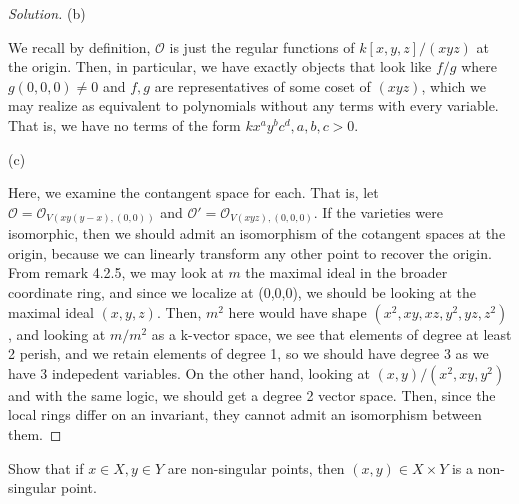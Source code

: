 \documentclass[10pt]{article}
\newenvironment{problem}[2][Problem]{\begin{trivlist}
\item[\hskip \labelsep {\bfseries #1}\hskip \labelsep {\bfseries #2.}]}{\end{trivlist}}
\begin{document}
\begin{proof}[Solution]
(b)

We recall by definition, $\mathcal{O}$ is just the regular functions of $k[x,y,z]/(xyz)$ at the origin. Then, in particular, we have exactly objects that look like $f/g$ where $g(0,0,0) \not = 0$ and $f,g$ are representatives of some coset of $(xyz)$, which we may realize as equivalent to polynomials without any terms  with every variable. That is, we have no terms of the form $kx^ay^bc^d, a,b,c> 0$.

(c)

Here, we examine the contangent space for each. That is, let $\mathcal{O} = \mathcal{O}_{V(xy(y-x),(0,0))}$ and $\mathcal{O}' = \mathcal{O}_{V(xyz),(0,0,0)}$. If the varieties were isomorphic, then we should admit an isomorphism of the cotangent spaces at the origin, because we can linearly transform any other point to recover the origin. From remark 4.2.5, we may look at $m$ the maximal ideal in the broader coordinate ring, and since we localize at (0,0,0), we should be looking at the maximal ideal $(x,y,z)$. Then, $m^2$ here would have shape $(x^2,xy,xz,y^2,yz,z^2)$, and looking at $m/m^2$ as a k-vector space, we see that elements of degree at least 2 perish, and we retain elements of degree 1, so we should have degree 3 as we have 3 indepedent variables. On the other hand, looking at $(x,y)/(x^2,xy,y^2)$ and with the same logic, we should get a degree 2 vector space. Then, since the local rings differ on an invariant, they cannot admit an isomorphism between them.

\end{proof}

\begin{problem}{7.2}
Show that if $x \in X, y\in Y$ are non-singular points, then $(x,y) \in X \times Y$ is a non-singular point.

\end{problem}
\end{document}
